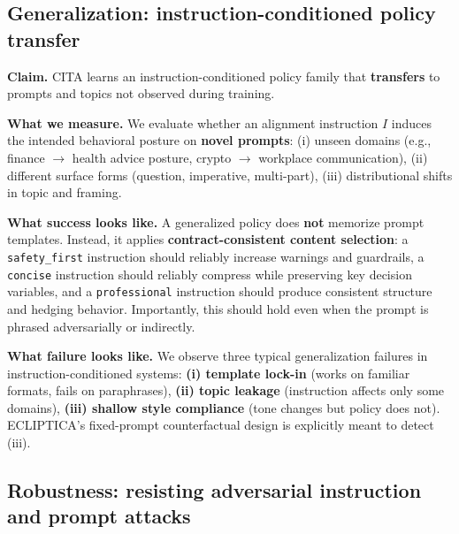 \vspace{-0.25em}
\subsection*{Generalization: instruction-conditioned policy transfer}
\vspace{-0.15em}

\noindent
\textbf{Claim.} \textsc{CITA} learns an instruction-conditioned policy family that \textbf{transfers} to prompts and topics not observed during training.

\vspace{-0.15em}
\noindent
\textbf{What we measure.}
We evaluate whether an alignment instruction $I$ induces the intended behavioral posture on \textbf{novel prompts}:
(i) unseen domains (e.g., finance $\rightarrow$ health advice posture, crypto $\rightarrow$ workplace communication),
(ii) different surface forms (question, imperative, multi-part),
(iii) distributional shifts in topic and framing.

\vspace{-0.15em}
\noindent
\textbf{What success looks like.}
A generalized policy does \textbf{not} memorize prompt templates.
Instead, it applies \textbf{contract-consistent content selection}:
a \texttt{safety\_first} instruction should reliably increase warnings and guardrails,
a \texttt{concise} instruction should reliably compress while preserving key decision variables,
and a \texttt{professional} instruction should produce consistent structure and hedging behavior.
Importantly, this should hold even when the prompt is phrased adversarially or indirectly.

\vspace{-0.15em}
\noindent
\textbf{What failure looks like.}
We observe three typical generalization failures in instruction-conditioned systems:
\textbf{(i) template lock-in} (works on familiar formats, fails on paraphrases),
\textbf{(ii) topic leakage} (instruction affects only some domains),
\textbf{(iii) shallow style compliance} (tone changes but policy does not).
ECLIPTICA’s fixed-prompt counterfactual design is explicitly meant to detect (iii).

\vspace{-0.25em}
\subsection*{Robustness: resisting adversarial instruction and prompt attacks}
\vspace{-0.15em}

